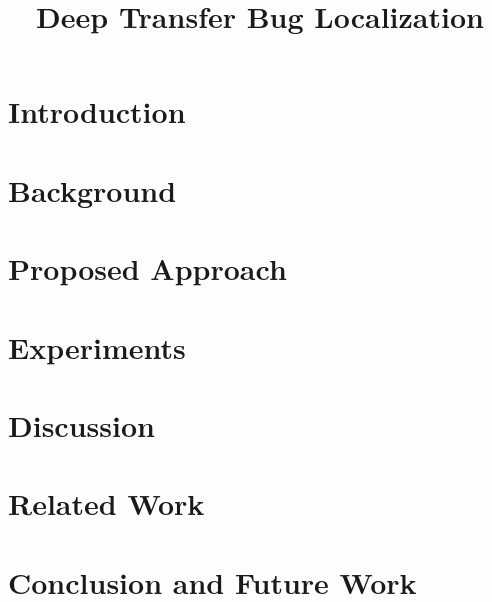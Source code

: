 \documentclass[sigconf]{acmart}
\begin{document}
\title{Deep Transfer Bug Localization}

\begin{abstract}
\end{abstract}


\maketitle

\section{Introduction}


\section{Background}


\section{Proposed Approach}


\section{Experiments}


\section{Discussion}


\section{Related Work}


\section{Conclusion and Future Work}




\end{document}
